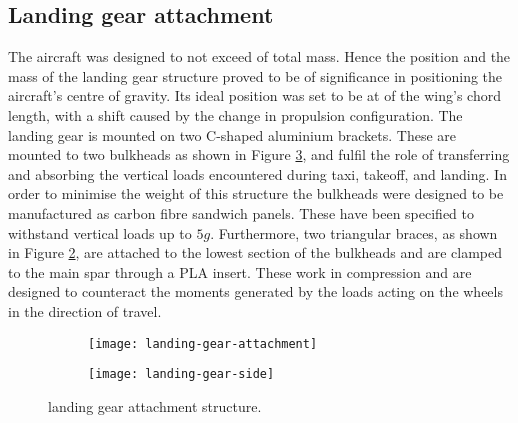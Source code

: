 \documentclass[../../main.tex]{subfiles}
\begin{document}

\subsection{Landing gear attachment} \label{sec:final-design-proposal:fuselage:landing-gear-attachment}

The aircraft was designed to not exceed  of total mass.
Hence the position and the mass of the landing gear structure proved to be of significance in positioning the aircraft's centre of gravity.
Its ideal position was set to be at  of the wing's chord length, with a  shift caused by the change in propulsion configuration.
The landing gear is mounted on two C-shaped  aluminium brackets.
These are mounted to two bulkheads as shown in Figure \ref{fig:landing-gear-attachment}, and fulfil the role of transferring and absorbing the vertical loads encountered during taxi, takeoff, and landing.
In order to minimise the weight of this structure the bulkheads were designed to be manufactured as carbon fibre sandwich panels.
These have been specified to withstand vertical loads up to $5g$.
Furthermore, two triangular braces, as shown in Figure \ref{fig:landing-gear-attachment:side}, are attached to the lowest section of the bulkheads and are clamped to the main spar through a PLA insert.
These work in compression and are designed to counteract the moments generated by the loads acting on the wheels in the direction of travel. 


\begin{figure}[H]

    \centering
    \begin{subfigure}[b]{0.4\columnwidth}
        \centering
        \texttt{[image: landing-gear-attachment]}
        \caption{}
        \label{fig:landing-gear-attachment:angled}
    \end{subfigure}
    \hfill
    \begin{subfigure}[b]{0.49\columnwidth}
        \centering
        \texttt{[image: landing-gear-side]}
        \caption{}
        \label{fig:landing-gear-attachment:side}
    \end{subfigure}
    
    \caption{landing gear attachment structure.}
    \label{fig:landing-gear-attachment}
\end{figure}
\end{document}
